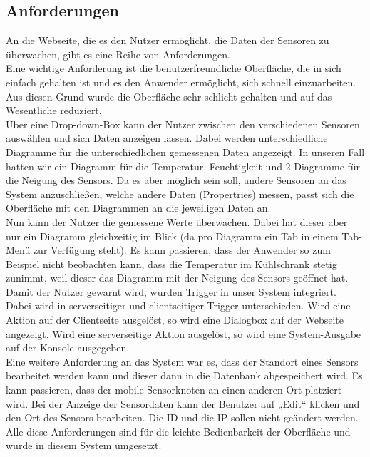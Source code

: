 \documentclass[12pt,a4paper,twoside]{article}
\begin{document}
\subsection{Anforderungen}

An die Webseite, die es den Nutzer ermöglicht, die Daten der Sensoren zu überwachen, gibt es eine Reihe von Anforderungen. \\
Eine wichtige Anforderung ist die benutzerfreundliche Oberfläche, die in sich einfach gehalten ist und es den Anwender ermöglicht, sich schnell einzuarbeiten. Aus diesen Grund wurde die Oberfläche sehr schlicht gehalten und auf das Wesentliche reduziert.\\
Über eine Drop-down-Box kann der Nutzer zwischen den verschiedenen Sensoren auswählen und sich Daten anzeigen lassen. Dabei werden unterschiedliche Diagramme für die unterschiedlichen gemessenen Daten angezeigt. In unseren Fall hatten wir ein Diagramm für die Temperatur, Feuchtigkeit und 2 Diagramme für die Neigung des Sensors. Da es aber möglich sein soll, andere Sensoren an das System anzuschließen, welche andere Daten (Propertries) messen, passt sich die Oberfläche mit den Diagrammen an die jeweiligen Daten an.\\
Nun kann der Nutzer die gemessene Werte überwachen. Dabei hat dieser aber nur ein Diagramm gleichzeitig im Blick (da pro Diagramm ein Tab in einem Tab-Menü zur Verfügung steht). Es kann passieren, dass der Anwender so zum Beispiel nicht beobachten kann, dass die Temperatur im Kühlschrank stetig zunimmt, weil dieser das Diagramm mit der Neigung des Sensors geöffnet hat. Damit der Nutzer gewarnt wird, wurden Trigger in unser System integriert. Dabei wird in serverseitiger und clientseitiger Trigger unterschieden. Wird eine Aktion auf der Clientseite ausgelöst, so wird eine Dialogbox auf der Webseite angezeigt. Wird eine serverseitige Aktion ausgelöst, so wird eine System-Ausgabe auf der Konsole ausgegeben.\\
Eine weitere Anforderung an das System war es, dass der Standort eines Sensors bearbeitet werden kann und dieser dann in die Datenbank abgespeichert wird. Es kann passieren, dass der mobile Sensorknoten an einen anderen Ort platziert wird. Bei der Anzeige der Sensordaten kann der Benutzer auf „Edit“ klicken und den Ort des Sensors bearbeiten. Die ID und die IP sollen nicht geändert werden. \\
Alle diese Anforderungen sind für die leichte Bedienbarkeit der Oberfläche und wurde in diesem System umgesetzt.
\end{document}
